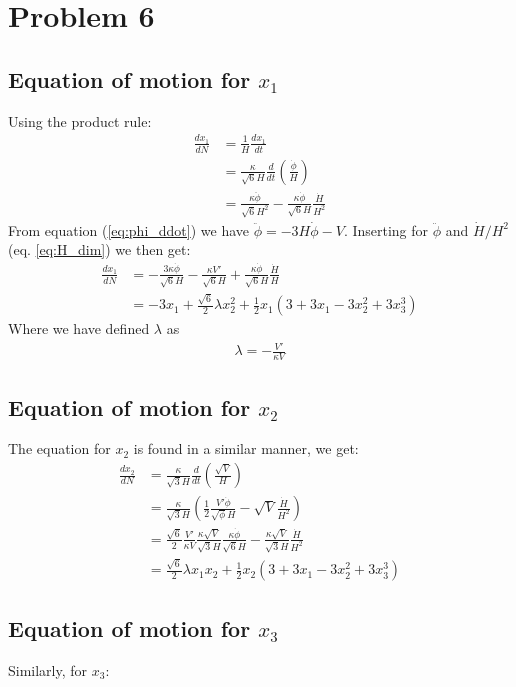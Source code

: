 \documentclass[reprint,english,notitlepage,nofootinbib]{revtex4-1}  %
\numberwithin{equation}{section}
\begin{document}
\section{Problem 6}
\subsection{Equation of motion for $x_1$}
Using the product rule:
\begin{align}
	\frac{dx_1}{dN} &= \frac{1}{H}\frac{dx_1}{dt} \\
	&= \frac{\kappa}{\sqrt{6}H}\frac{d}{dt}\left(\frac{\dot{\phi}}{H}\right)\\
	&= \frac{\kappa\ddot{\phi}}{\sqrt{6}H^2} - \frac{\kappa\dot{\phi}}{\sqrt{6}H}\frac{\dot{H}}{H^2}
\end{align}
From equation (\ref{eq:phi_ddot}) we have $\ddot{\phi}=-3H\dot{\phi}-{V}$.
Inserting for $\ddot{\phi}$ and $\dot{H}/H^2$ (eq. \ref{eq:H_dim}) we then get:
\begin{align}
	\frac{dx_1}{dN} &= -\frac{3\kappa\dot{\phi}}{\sqrt{6}H} - \frac{\kappa V'}{\sqrt{6}H}
										+ \frac{\kappa\dot{\phi}}{\sqrt{6}H}\frac{\dot{H}}{H} \\
									&= -3x_1	 + \frac{\sqrt{6}}{2}\lambda x_2^2
										+ \frac{1}{2}x_1(3+3x_1 - 3x_2^2 + 3x_3^3)
\end{align}
Where we have defined $\lambda$ as
\begin{align}
	\lambda = -\frac{V'}{\kappa V}
\end{align}

\subsection{Equation of motion for $x_2$}
The equation for $x_2$ is found in a similar manner, we get:
\begin{align}
	\frac{dx_2}{dN} &= \frac{\kappa}{\sqrt{3}H}\frac{d}{dt}\left(\frac{\sqrt{V}}{H}\right)\\
									&= \frac{\kappa}{\sqrt{3}H}\left(\frac{1}{2}\frac{V'\dot{\phi}}
									{\sqrt{\phi}H}-\sqrt{V}\frac{\dot{H}}{H^2}\right) \\
									&=\frac{\sqrt{6}}{2}\frac{V'}{\kappa V}\frac{\kappa \sqrt{V}}{\sqrt{3}H}
										\frac{\kappa\dot{\phi}}{\sqrt{6}H} - \frac{\kappa\sqrt{V}}{\sqrt{3}H}
										\frac{\dot{H}}{H^2} \\
									&=\frac{\sqrt{6}}{2}\lambda x_1 x_2 + \frac{1}{2}x_2
									(3+3x_1 - 3x_2^2 + 3x_3^3)
\end{align}
\subsection{Equation of motion for $x_3$}
Similarly, for $x_3$:
\end{document}
